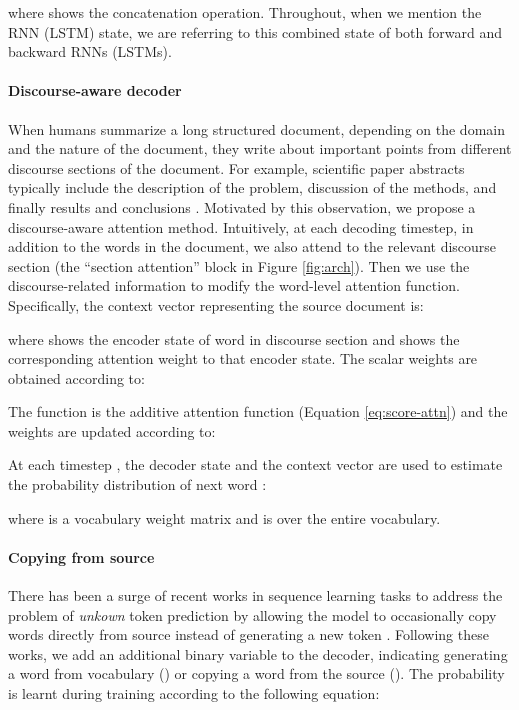 \documentclass[11pt,a4paper]{article}
\newcommand{\I}[1][\textit]{#1}
\begin{document}
where  shows the concatenation operation.
Throughout, when we mention the RNN (LSTM) state, we are referring to this combined state of both forward and backward RNNs (LSTMs).

\paragraph{Discourse-aware decoder}

When humans summarize a long structured document, depending on the domain and the nature of the document, they write about important points from different discourse sections of the document. For example, scientific paper abstracts typically include the description of the problem, discussion of the methods, and finally results and conclusions \cite{Suppe1998-SUPTSO}. Motivated by this observation, we propose a discourse-aware attention method.
Intuitively, at each decoding timestep, in addition to the words in the document, we also attend to the relevant discourse section (the ``section attention'' block in Figure \ref{fig:arch}). Then we use the discourse-related information to modify the word-level attention function. Specifically, the context vector representing the source document is:



\noindent where  shows the encoder state of word  in discourse section  and  shows the corresponding attention weight to that encoder state. The scalar weights  are obtained according to:



\noindent The  function is the additive attention function (Equation \ref{eq:score-attn}) and the weights  are updated according to:


At each timestep , the decoder state  and the context vector  are used to estimate the probability distribution of next word :



\noindent where  is a vocabulary weight matrix and  is over the entire vocabulary.


\paragraph{Copying from source}

There has been a surge of recent works in sequence learning tasks to address the problem of \I{unkown} token prediction by allowing the model to occasionally copy words directly from source instead of generating a new token \cite{gu2016incorporating,see2017get,paulus2017deep,wiseman2017challenges}. Following these works, we add an additional binary variable  to the decoder, indicating generating a word from vocabulary () or copying a word from the source (). The probability is learnt during training according to the following equation:
\end{document}
